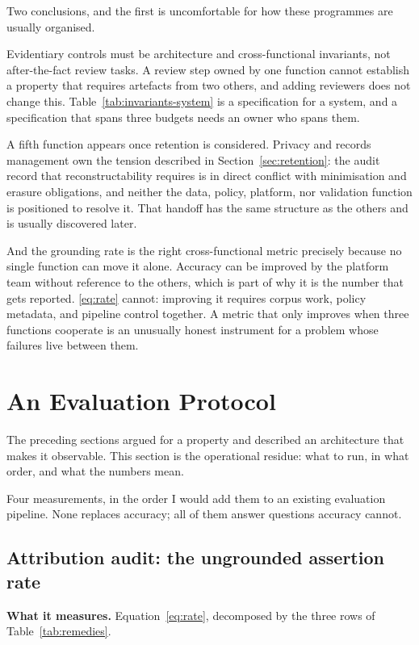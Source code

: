 \documentclass[11pt]{article}
\theoremstyle{plain}
\theoremstyle{definition}
\begin{document}
Two conclusions, and the first is uncomfortable for how these programmes are
usually organised.

Evidentiary controls must be architecture and cross-functional invariants, not
after-the-fact review tasks. A review step owned by one function cannot establish a
property that requires artefacts from two others, and adding reviewers does not
change this. Table~\ref{tab:invariants-system} is a specification for a system, and
a specification that spans three budgets needs an owner who spans them.

A fifth function appears once retention is considered. Privacy and records
management own the tension described in Section~\ref{sec:retention}: the audit record
that reconstructability requires is in direct conflict with minimisation and erasure
obligations, and neither the data, policy, platform, nor validation function is
positioned to resolve it. That handoff has the same structure as the others and is
usually discovered later.

And the grounding rate is the right cross-functional metric precisely because no
single function can move it alone. Accuracy can be improved by the platform team
without reference to the others, which is part of why it is the number that gets
reported. \eqref{eq:rate} cannot: improving it requires corpus work, policy
metadata, and pipeline control together. A metric that only improves when three
functions cooperate is an unusually honest instrument for a problem whose failures
live between them.


\section{An Evaluation Protocol}
\label{sec:evaluation}

The preceding sections argued for a property and described an architecture that makes it
observable. This section is the operational residue: what to run, in what order, and what
the numbers mean.

Four measurements, in the order I would add them to an existing evaluation
pipeline. None replaces accuracy; all of them answer questions accuracy cannot.

\subsection{Attribution audit: the ungrounded assertion rate}
\label{sec:measure-rate}

\textbf{What it measures.} Equation~\eqref{eq:rate}, decomposed by the three rows
of Table~\ref{tab:remedies}.
\end{document}
